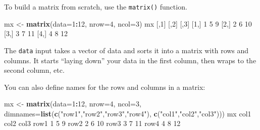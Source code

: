\documentclass[]{book}
\newenvironment{Shaded}{\begin{snugshade}}{\end{snugshade}}
\newcommand{\DataTypeTok}[1]{\textcolor[rgb]{0.13,0.29,0.53}{#1}}
\newcommand{\DecValTok}[1]{\textcolor[rgb]{0.00,0.00,0.81}{#1}}
\newcommand{\KeywordTok}[1]{\textcolor[rgb]{0.13,0.29,0.53}{\textbf{#1}}}
\newcommand{\NormalTok}[1]{#1}
\newcommand{\OperatorTok}[1]{\textcolor[rgb]{0.81,0.36,0.00}{\textbf{#1}}}
\newcommand{\StringTok}[1]{\textcolor[rgb]{0.31,0.60,0.02}{#1}}
\begin{document}
To build a matrix from scratch, use the \texttt{matrix()} function.

\begin{Shaded}
\begin{Highlighting}[]
\NormalTok{mx <-}\StringTok{ }\KeywordTok{matrix}\NormalTok{(}\DataTypeTok{data=}\DecValTok{1}\OperatorTok{:}\DecValTok{12}\NormalTok{, }
             \DataTypeTok{nrow=}\DecValTok{4}\NormalTok{,}
             \DataTypeTok{ncol=}\DecValTok{3}\NormalTok{)}
\NormalTok{mx}
\NormalTok{     [,}\DecValTok{1}\NormalTok{] [,}\DecValTok{2}\NormalTok{] [,}\DecValTok{3}\NormalTok{]}
\NormalTok{[}\DecValTok{1}\NormalTok{,]    }\DecValTok{1}    \DecValTok{5}    \DecValTok{9}
\NormalTok{[}\DecValTok{2}\NormalTok{,]    }\DecValTok{2}    \DecValTok{6}   \DecValTok{10}
\NormalTok{[}\DecValTok{3}\NormalTok{,]    }\DecValTok{3}    \DecValTok{7}   \DecValTok{11}
\NormalTok{[}\DecValTok{4}\NormalTok{,]    }\DecValTok{4}    \DecValTok{8}   \DecValTok{12}
\end{Highlighting}
\end{Shaded}

The \texttt{data} input takes a vector of data and sorts it into a matrix with rows and columns. It starts ``laying down'' your data in the first column, then wraps to the second column, etc.

You can also define names for the rows and columns in a matrix:

\begin{Shaded}
\begin{Highlighting}[]
\NormalTok{mx <-}\StringTok{ }\KeywordTok{matrix}\NormalTok{(}\DataTypeTok{data=}\DecValTok{1}\OperatorTok{:}\DecValTok{12}\NormalTok{, }
             \DataTypeTok{nrow=}\DecValTok{4}\NormalTok{,}
             \DataTypeTok{ncol=}\DecValTok{3}\NormalTok{,}
             \DataTypeTok{dimnames=}\KeywordTok{list}\NormalTok{(}\KeywordTok{c}\NormalTok{(}\StringTok{"row1"}\NormalTok{,}\StringTok{"row2"}\NormalTok{,}\StringTok{"row3"}\NormalTok{,}\StringTok{"row4"}\NormalTok{),}
                           \KeywordTok{c}\NormalTok{(}\StringTok{"col1"}\NormalTok{,}\StringTok{"col2"}\NormalTok{,}\StringTok{"col3"}\NormalTok{)))}
\NormalTok{mx}
\NormalTok{     col1 col2 col3}
\NormalTok{row1    }\DecValTok{1}    \DecValTok{5}    \DecValTok{9}
\NormalTok{row2    }\DecValTok{2}    \DecValTok{6}   \DecValTok{10}
\NormalTok{row3    }\DecValTok{3}    \DecValTok{7}   \DecValTok{11}
\NormalTok{row4    }\DecValTok{4}    \DecValTok{8}   \DecValTok{12}
\end{Highlighting}
\end{Shaded}
\end{document}

